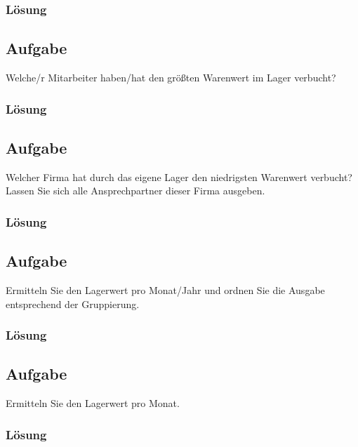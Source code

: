 \subsubsection*{Lösung}
\label{sec:uebung_04.aufgabe_06.loesung}

\subsection{Aufgabe}
\label{sec:uebung_04.aufgabe_07}
Welche/r Mitarbeiter haben/hat den größten Warenwert im Lager verbucht?

\subsubsection*{Lösung}
\label{sec:uebung_04.aufgabe_07.loesung}

\subsection{Aufgabe}
\label{sec:uebung_04.aufgabe_08}
Welcher Firma hat durch das eigene Lager den niedrigsten Warenwert verbucht? Lassen Sie sich alle Ansprechpartner dieser Firma ausgeben.

\subsubsection*{Lösung}
\label{sec:uebung_04.aufgabe_08.loesung}

\subsection{Aufgabe}
\label{sec:uebung_04.aufgabe_09}
Ermitteln Sie den Lagerwert pro Monat/Jahr und ordnen Sie die Ausgabe entsprechend der Gruppierung.

\subsubsection*{Lösung}
\label{sec:uebung_04.aufgabe_09.loesung}

\subsection{Aufgabe}
\label{sec:uebung_04.aufgabe_10}
Ermitteln Sie den Lagerwert pro Monat.

\subsubsection*{Lösung}
\label{sec:uebung_04.aufgabe_10.loesung}

